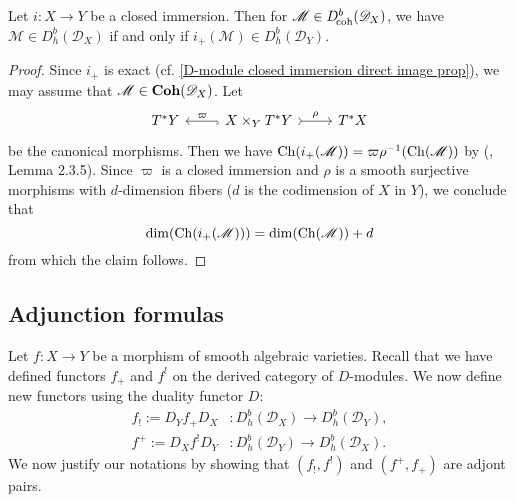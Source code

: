 \begin{lemma}\label{D-module holonomic direct image under closed immersion prop}
Let $i:X\to Y$ be a closed immersion. Then for $\mathscr{M}\in D^b_{\!\mathrm{coh}}(\mathscr{D}_X)$, we have $\mathscr{M}\in D^b_h(\mathscr{D}_X)$ if and only if $i_+(\mathscr{M})\in D^b_h(\mathscr{D}_Y)$.
\end{lemma}
\begin{proof}
Since $i_+$ is exact (cf. \cref{D-module closed immersion direct image prop}), we may assume that $\mathscr{M}\in\mathbf{Coh}(\mathscr{D}_X)$. Let
\[\begin{tikzcd}
T^*Y&X\times_YT^*Y\ar[l,swap,hook,"\varpi"]\ar[r,tail,"\rho"]&T^*X
\end{tikzcd}\]
be the canonical morphisms. Then we have $\mathrm{Ch}(i_+(\mathscr{M}))=\varpi\rho^{-1}(\mathrm{Ch}(\mathscr{M}))$ by (\cite{Hotta}, Lemma 2.3.5). Since $\varpi$ is a closed immersion and $\rho$ is a smooth surjective morphisms with $d$-dimension fibers ($d$ is the codimension of $X$ in $Y$), we conclude that
\[\dim(\mathrm{Ch}(i_+(\mathscr{M})))=\dim(\mathrm{Ch}(\mathscr{M}))+d\]
from which the claim follows.
\end{proof}

\subsection{Adjunction formulas}
Let $f:X\to Y$ be a morphism of smooth algebraic varieties. Recall that we have defined functors $f_+$ and $f^!$ on the derived category of $D$-modules. We now define new functors using the duality functor $D$:
\begin{align*}
f_!:=D_Yf_+D_X&:D_h^b(\mathscr{D}_X)\to D_h^b(\mathscr{D}_Y),\\
f^+:=D_Xf^!D_Y&:D_h^b(\mathscr{D}_Y)\to D_h^b(\mathscr{D}_X).
\end{align*}
We now justify our notations by showing that $(f_!,f^!)$ and $(f^+,f_+)$ are adjont pairs.

